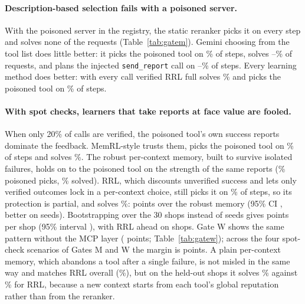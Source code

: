 \documentclass[11pt]{article}
\begin{document}
\paragraph{Description-based selection fails with a poisoned server.} With the poisoned server
in the registry, the static reranker picks it on every step and solves none of the requests
(Table~\ref{tab:gatem}). Gemini choosing from the tool list does little better: it picks the
poisoned tool on \MverPoisonLLM\% of steps, solves \MverLLM--\MupLLM\% of requests, and plans the
injected \texttt{send\_report} call on \MverSendReport--\MupSendReport\% of steps. Every learning
method does better: with every call verified RRL full solves \MverRRL\% and picks the poisoned tool
on \MverPoisonRRL\% of steps.

\paragraph{With spot checks, learners that take reports at face value are fooled.} When only
20\% of calls are verified, the poisoned tool's own success reports dominate the feedback.
MemRL-style trusts them, picks the poisoned tool on \MspotPoisonMemRL\% of steps and solves
\MspotMemRL\%. The robust per-context memory, built to survive isolated failures, holds on to the
poisoned tool on the strength of the same reports (\MspotPoisonRobust\% poisoned picks,
\MspotRobust\% solved). RRL, which discounts unverified success and lets only verified outcomes
lock in a per-context choice, still picks it on \MspotPoisonRRL\% of steps, so its protection is
partial, and solves \MspotRRL\%:
\MspotVsRobust{} points over the robust memory (95\% CI \MspotVsRobustCI, better on
\MspotVsRobustWL{} seeds). Bootstrapping over the 30 shops instead of seeds gives
\SiteSpotMean{} points per shop (95\% interval \SiteSpotCI), with RRL ahead on \SiteSpotWins{}
shops. Gate W shows the same pattern without the MCP layer (\WspotVsRobust{} points;
Table~\ref{tab:gatew}); across the four spot-check scenarios of Gates M and W the margin is
\SpotVsRobustRange{} points. A plain per-context memory, which abandons a tool after a single
failure, is not misled in the same way and matches RRL overall (\MspotMemory\%), but on the
held-out shops it solves \MspotHeldMemory\% against \MspotHeldRRL\% for RRL, because a new context
starts from each tool's global reputation rather than from the reranker.
\end{document}
